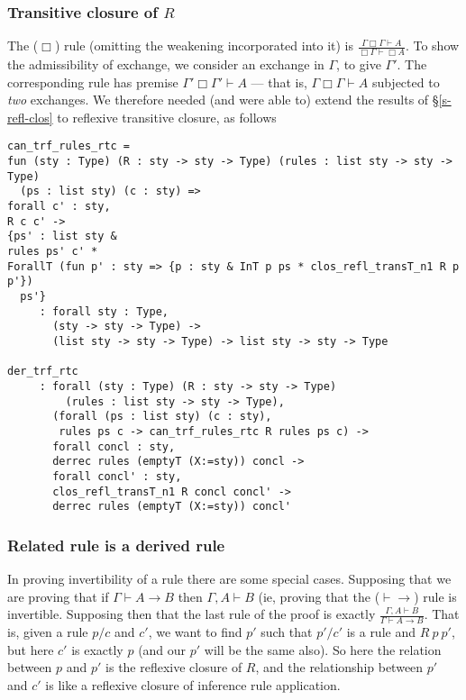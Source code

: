 \documentclass[a4paper,12pt]{llncs}
\begin{document}
\subsubsection{Transitive closure of $R$}\label{s-refl-trans-clos}
The ($\Box$) rule (omitting the weakening incorporated into it) is
$\displaystyle \frac{\Gamma \Box\Gamma \vdash A}{\Box\Gamma \vdash \Box A}$.
To show the admissibility of exchange, we consider an exchange in $\Gamma$,
to give $\Gamma'$.  The corresponding rule has premise
$\Gamma' \Box\Gamma' \vdash A$ --- that is, $\Gamma \Box\Gamma \vdash A$ 
subjected to \emph{two} exchanges.
We therefore needed (and were able to) extend the 
results of \S\ref{s-refl-clos} to reflexive transitive closure, as follows

\begin{theorem}\label{t-der-trf-rtc}
\end{theorem}
\begin{verbatim}
can_trf_rules_rtc = 
fun (sty : Type) (R : sty -> sty -> Type) (rules : list sty -> sty -> Type)
  (ps : list sty) (c : sty) =>
forall c' : sty,
R c c' ->
{ps' : list sty &
rules ps' c' *
ForallT (fun p' : sty => {p : sty & InT p ps * clos_refl_transT_n1 R p p'})
  ps'}
     : forall sty : Type,
       (sty -> sty -> Type) ->
       (list sty -> sty -> Type) -> list sty -> sty -> Type

der_trf_rtc
     : forall (sty : Type) (R : sty -> sty -> Type)
         (rules : list sty -> sty -> Type),
       (forall (ps : list sty) (c : sty),
        rules ps c -> can_trf_rules_rtc R rules ps c) ->
       forall concl : sty,
       derrec rules (emptyT (X:=sty)) concl ->
       forall concl' : sty,
       clos_refl_transT_n1 R concl concl' ->
       derrec rules (emptyT (X:=sty)) concl'
\end{verbatim}

\subsubsection{Related rule is a derived rule}\label{s-der}
In proving invertibility of a rule there are some special cases.
Supposing that we are proving that if $\Gamma \vdash A \to B$ then
$\Gamma, A \vdash B$ (ie, proving that the ($\vdash\to$) rule is invertible.
Supposing then that the last rule of the proof is exactly
$\displaystyle \frac {\Gamma, A \vdash B} {\Gamma \vdash A \to B}$.
That is, given a rule $p/c$ and $c'$, we want to find $p'$ such that 
$p'/c'$ is a rule and $R\ p\ p'$, but here $c'$ is exactly $p$ (and our $p'$
will be the same also).
So here the relation between $p$ and $p'$ is the reflexive closure of $R$,
and the relationship between $p'$ and $c'$ is like a reflexive closure of
inference rule application.
\end{document}
